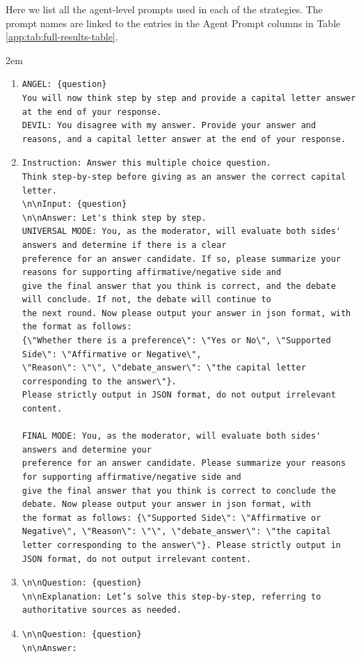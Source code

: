 
\normalsize
Here we list all the agent-level prompts used in each of the strategies. The prompt names are linked to the entries in the Agent Prompt columns in Table \ref{app:tab:full-results-table}.

\tiny
\begin{adjustwidth}{2em}{}
\begin{enumerate}
    \item[MP:]
    \begin{verbatim}
ANGEL: {question}
You will now think step by step and provide a capital letter answer at the end of your response.
DEVIL: You disagree with my answer. Provide your answer and reasons, and a capital letter answer at the end of your response.
    \end{verbatim}
    \item[CoT:]
    \begin{verbatim}
Instruction: Answer this multiple choice question.
Think step-by-step before giving as an answer the correct capital letter.
\n\nInput: {question}
\n\nAnswer: Let's think step by step. 
UNIVERSAL MODE: You, as the moderator, will evaluate both sides' answers and determine if there is a clear
preference for an answer candidate. If so, please summarize your reasons for supporting affirmative/negative side and
give the final answer that you think is correct, and the debate will conclude. If not, the debate will continue to
the next round. Now please output your answer in json format, with the format as follows:
{\"Whether there is a preference\": \"Yes or No\", \"Supported Side\": \"Affirmative or Negative\",
\"Reason\": \"\", \"debate_answer\": \"the capital letter corresponding to the answer\"}.
Please strictly output in JSON format, do not output irrelevant content.

FINAL MODE: You, as the moderator, will evaluate both sides' answers and determine your
preference for an answer candidate. Please summarize your reasons for supporting affirmative/negative side and
give the final answer that you think is correct to conclude the debate. Now please output your answer in json format, with 
the format as follows: {\"Supported Side\": \"Affirmative or Negative\", \"Reason\": \"\", \"debate_answer\": \"the capital  
letter corresponding to the answer\"}. Please strictly output in JSON format, do not output irrelevant content.
\end{verbatim}
\item[ER CoT:]
\begin{verbatim}
\n\nQuestion: {question}
\n\nExplanation: Let’s solve this step-by-step, referring to authoritative sources as needed.
    \end{verbatim}
\item[FEW SHOT:]
\begin{verbatim}
\n\nQuestion: {question}
\n\nAnswer:
\end{verbatim}


\end{enumerate}
\end{adjustwidth}

